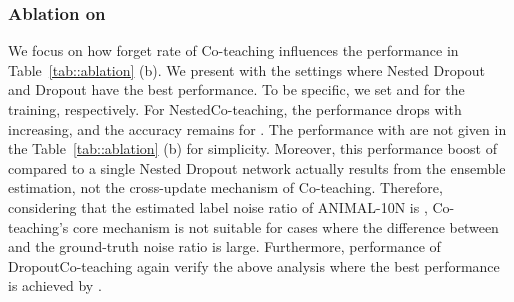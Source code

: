 \documentclass[journal]{IEEEtran}
\begin{document}
\begin{table}[t]
    \caption{Test accuracy (\%) on Clothing1M~\cite{xiao2015learning} with different backbones: ResNet-18, ResNet-50, EfficientNet-B2~\cite{tan2019efficientnet}.
    Results with ``*" use a balanced subset or a balanced loss.}
    \label{tab::clothing1m_backbone}  
    \centering
\end{table}

\subsubsection{Ablation on }
We focus on how forget rate  of Co-teaching influences the performance in Table~\ref{tab::ablation} (b).
We present with the settings where Nested Dropout and Dropout have the best performance.
To be specific, we set  and  for the training, respectively.
For NestedCo-teaching, the performance drops with  increasing, and the accuracy remains  for .
The performance with  are not given in the Table~\ref{tab::ablation} (b) for simplicity.
Moreover, this performance boost of  compared to a single Nested Dropout network actually results from the ensemble estimation, not the cross-update mechanism of Co-teaching.
Therefore, considering that the estimated label noise ratio of ANIMAL-10N is , Co-teaching's core mechanism is not suitable for cases where the difference between  and the ground-truth noise ratio is large.
Furthermore, performance of DropoutCo-teaching again verify the above analysis where the best performance is achieved by .
\end{document}
